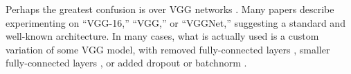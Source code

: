 Perhaps the greatest confusion is over VGG networks \cite{vgg}. Many papers describe experimenting on ``VGG-16,'' ``VGG,'' or ``VGGNet,'' suggesting a standard and well-known architecture. In many cases, what is actually used is a custom variation of some VGG model, with removed fully-connected layers \cite{google-interchannel, thinet-channel-norms}, smaller fully-connected layers \cite{snip}, or added dropout or batchnorm \cite{network-slimming, snip, extreme-net-compress,sparse-variational-dropout, ding-auto-balanced, apple-pfa}.%





